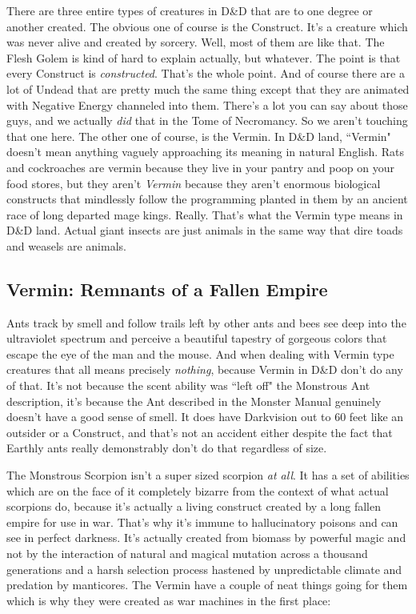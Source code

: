 There are three entire types of creatures in D\&D that are to one degree or another created. The obvious one of course is the Construct. It's a creature which was never alive and created by sorcery. Well, most of them are like that. The Flesh Golem is kind of hard to explain actually, but whatever. The point is that every Construct is \textit{constructed}. That's the whole point. And of course there are a lot of Undead that are pretty much the same thing except that they are animated with Negative Energy channeled into them. There's a lot you can say about those guys, and we actually \textit{did} that in the Tome of Necromancy. So we aren't touching that one here. The other one of course, is the Vermin. In D\&D land, ``Vermin" doesn't mean anything vaguely approaching its meaning in natural English. Rats and cockroaches are vermin because they live in your pantry and poop on your food stores, but they aren't \textit{Vermin} because they aren't enormous biological constructs that mindlessly follow the programming planted in them by an ancient race of long departed mage kings. Really. That's what the Vermin type means in D\&D land. Actual giant insects are just animals in the same way that dire toads and weasels are animals.

\subsection{Vermin: Remnants of a Fallen Empire}
\vspace*{-8pt}

Ants track by smell and follow trails left by other ants and bees see deep into the ultraviolet spectrum and perceive a beautiful tapestry of gorgeous colors that escape the eye of the man and the mouse. And when dealing with Vermin type creatures that all means precisely \textit{nothing}, because Vermin in D\&D don't do any of that. It's not because the scent ability was ``left off" the Monstrous Ant description, it's because the Ant described in the Monster Manual genuinely doesn't have a good sense of smell. It does have Darkvision out to 60 feet like an outsider or a Construct, and that's not an accident either despite the fact that Earthly ants really demonstrably don't do that regardless of size.

The Monstrous Scorpion isn't a super sized scorpion \textit{at all}. It has a set of abilities which are on the face of it completely bizarre from the context of what actual scorpions do, because it's actually a living construct created by a long fallen empire for use in war. That's why it's immune to hallucinatory poisons and can see in perfect darkness. It's actually created from biomass by powerful magic and not by the interaction of natural and magical mutation across a thousand generations and a harsh selection process hastened by unpredictable climate and predation by manticores. The Vermin have a couple of neat things going for them which is why they were created as war machines in the first place:

